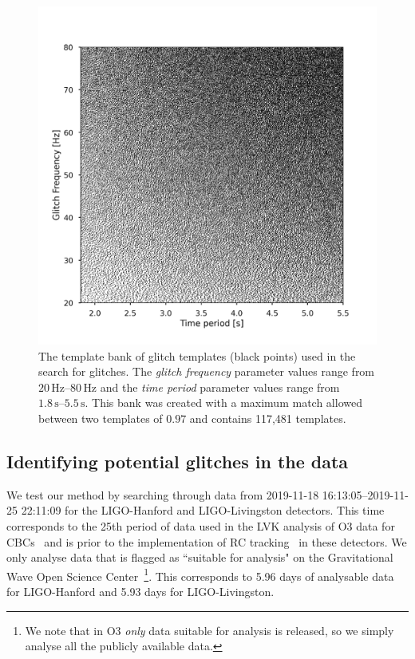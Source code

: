 \begin{figure}
  \centering
  \includegraphics[width=1.0\textwidth]{images/4_archenemy/Section3/3.2/template_bank_square.pdf}
  \caption{The template bank of \scladj glitch templates (black points) used in the search for \scladj glitches. The \emph{glitch frequency} parameter values range from $20 \, \text{Hz}\text{--} 80 \, \text{Hz}$ and the \emph{time period} parameter values range from $1.8 \, \text{s}\text{--} 5.5 \, \text{s}$. This bank was created with a maximum match allowed between two templates of $0.97$ and contains 117,481 templates.}
  \label{4:fig:sq_bank}
\end{figure}

\subsection{Identifying potential \scladj glitches in the data}

We test our method by searching through \gwadj data from 2019-11-18 16:13:05--2019-11-25 22:11:09 for the LIGO-Hanford and LIGO-Livingston detectors. This time corresponds to the 25th period of data used in the LVK analysis of O3 data for CBCs~\cite{gwtc3:2023} and is prior to the implementation of RC tracking~\cite{reducing_scattering:2020} in these detectors. We only analyse data that is flagged as ``suitable for analysis" on the Gravitational Wave Open Science Center~\cite{GWOSC:2021}\footnote{We note that in O3 \emph{only} data suitable for analysis is released, so we simply analyse all the publicly available data.}. This corresponds to 5.96 days of analysable data for LIGO-Hanford and 5.93 days for LIGO-Livingston.

